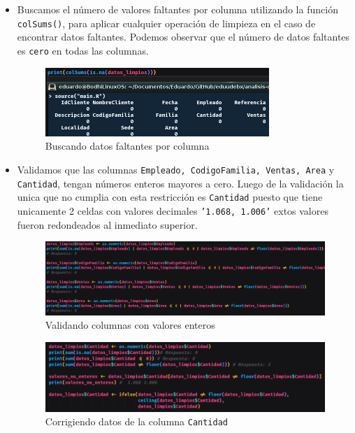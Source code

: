 \documentclass[12pt]{article}
\begin{document}
\begin{itemize}
                \item Buscamos el número de valores faltantes por columna utilizando la función \texttt{colSums()}, para aplicar cualquier operación de limpieza en el caso de encontrar datos faltantes. Podemos observar que el número de datos faltantes es \texttt{cero} en todas las columnas.
                    \begin{figure}[h]
                        \centering 
                        \includegraphics[width=0.8\textwidth]{img/limpieza-7.png}
                        \caption{Buscando datos faltantes por columna}
                    \end{figure}
                
                \item Validamos que las columnas \texttt{Empleado, CodigoFamilia, Ventas, Area} y \texttt{Cantidad}, tengan números enteros mayores a cero. Luego de la validación la unica que no cumplia con esta restricción es \texttt{Cantidad} puesto que tiene unicamente 2 celdas con valores decimales \texttt{'1.068, 1.006'} extos valores fueron redondeados al inmediato superior.
                    \begin{figure}[h]
                        \centering 
                        \includegraphics[width=1\textwidth]{img/limpieza-8.png}
                        \caption{Validando columnas con valores enteros}
                    \end{figure}

                    \newpage
                    \begin{figure}[h]
                        \centering 
                        \includegraphics[width=1\textwidth]{img/limpieza-9.png}
                        \caption{Corrigiendo datos de la columna \texttt{Cantidad}}
                    \end{figure}
                

\end{itemize}
\end{document}
